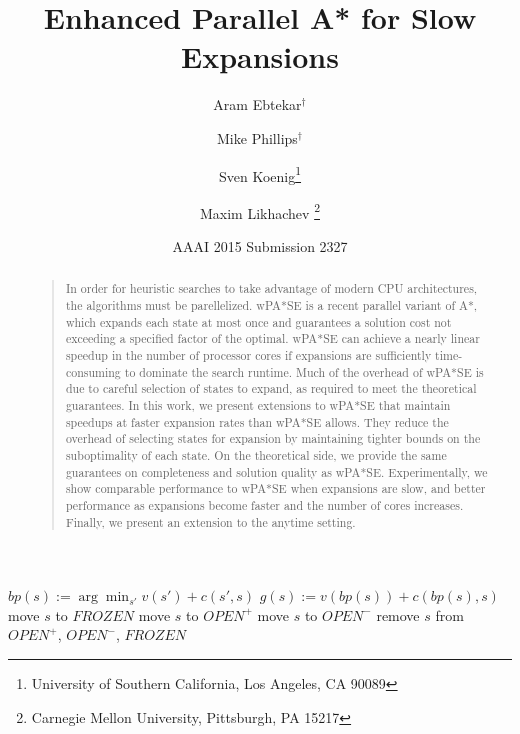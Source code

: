 \documentclass[letterpaper]{article}
\begin{document}
%
\title{Enhanced Parallel A* for Slow Expansions}
\author{Aram Ebtekar$^\dagger$ \and Mike Phillips$^\dagger$ \and Sven Koenig\thanks{University of Southern California, Los Angeles, CA 90089} \and Maxim Likhachev%
\thanks{Carnegie Mellon University, Pittsburgh, PA 15217}%
%
}
\author{AAAI 2015 Submission 2327}%
\maketitle
\begin{abstract}
\begin{quote}
In order for heuristic searches to take advantage of modern CPU architectures, the algorithms must be parellelized.
wPA*SE is a recent parallel variant of A*, which expands each state at most once and guarantees a solution cost not exceeding a specified factor of the optimal.
wPA*SE can achieve a nearly linear speedup in the number of processor cores if expansions are sufficiently time-consuming to dominate the search runtime.
Much of the overhead of wPA*SE is due to careful selection of states to expand, as required to meet the theoretical guarantees.
In this work, we present extensions to wPA*SE that maintain speedups at faster expansion rates than wPA*SE allows.
They reduce the overhead of selecting states for expansion by maintaining tighter bounds on the suboptimality of each state.
On the theoretical side, we provide the same guarantees on completeness and solution quality as wPA*SE.
Experimentally, we show comparable performance to wPA*SE when expansions are slow, and better performance as expansions become faster and the number of cores increases.
Finally, we present an extension to the anytime setting.
\end{quote}
\end{abstract}

\begin{algorithm}
\caption{$update(s)$}
\label{alg:update}
\begin{algorithmic}
\STATE $bp(s) := \arg\min_{s'} v(s') + c(s',s)$
\STATE $g(s) := v(bp(s)) + c(bp(s),s)$
\STATE move $s$ to $FROZEN$
\ELSE
\STATE move $s$ to $OPEN^+$
\ENDIF
{}
\STATE move $s$ to $OPEN^-$
\ELSE
\STATE remove $s$ from $OPEN^+$, $OPEN^-$, $FROZEN$
\ENDIF
\end{algorithmic}
\end{algorithm}
\end{document}
